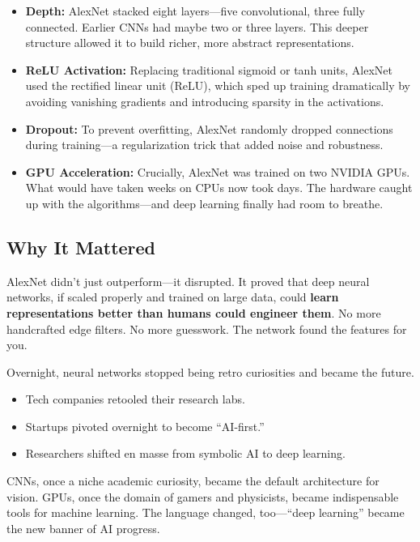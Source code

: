 \begin{itemize}
  \item \textbf{Depth:} AlexNet stacked eight layers—five convolutional, three fully connected. Earlier CNNs had maybe two or three layers. This deeper structure allowed it to build richer, more abstract representations.
  
  \item \textbf{ReLU Activation:} Replacing traditional sigmoid or tanh units, AlexNet used the rectified linear unit (ReLU), which sped up training dramatically by avoiding vanishing gradients and introducing sparsity in the activations.
  
  \item \textbf{Dropout:} To prevent overfitting, AlexNet randomly dropped connections during training—a regularization trick that added noise and robustness.
  
  \item \textbf{GPU Acceleration:} Crucially, AlexNet was trained on two NVIDIA GPUs. What would have taken weeks on CPUs now took days. The hardware caught up with the algorithms—and deep learning finally had room to breathe.
\end{itemize}

\subsection{Why It Mattered}

AlexNet didn’t just outperform—it disrupted.  
It proved that deep neural networks, if scaled properly and trained on large data, could \textbf{learn representations better than humans could engineer them}. No more handcrafted edge filters. No more guesswork. The network found the features for you.

Overnight, neural networks stopped being retro curiosities and became the future.

\begin{itemize}
  \item Tech companies retooled their research labs.
  \item Startups pivoted overnight to become “AI-first.”
  \item Researchers shifted en masse from symbolic AI to deep learning.
\end{itemize}

CNNs, once a niche academic curiosity, became the default architecture for vision.  
GPUs, once the domain of gamers and physicists, became indispensable tools for machine learning.  
The language changed, too—“deep learning” became the new banner of AI progress.

